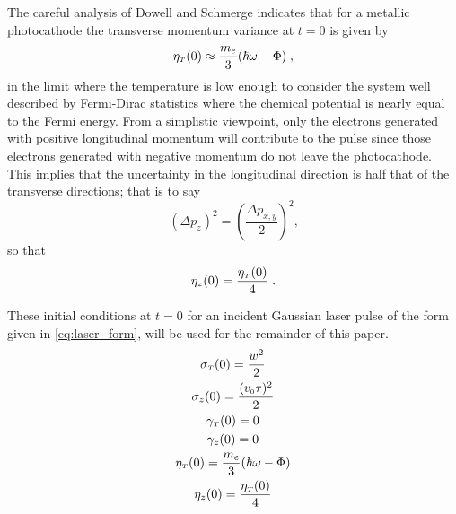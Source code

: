 The careful analysis of Dowell and Schmerge \cite{dowell_quantum_2009} indicates that for a metallic photocathode the transverse momentum variance at $ t = 0 $ is given by
\begin{equation} \label{eq:jensen_eta}
  \eta_{ {\scriptscriptstyle T} } ( 0 ) \approx \frac{ m_{e} }{ 3 } ( \hbar \omega - \Phi ) \; \text{,}
\end{equation}
in the limit where the temperature is low enough to consider the system well described by Fermi-Dirac statistics where the chemical potential is nearly equal to the Fermi energy.
From a simplistic viewpoint, only the electrons generated with positive longitudinal momentum will contribute to the pulse since those electrons generated with negative momentum do not leave the photocathode.
This implies that the uncertainty in the longitudinal direction is half that of the transverse directions; that is to say
\begin{equation}
( \Delta p_{ z } )^{2} = \left ( \frac{\Delta p_{ x , y }}{ 2 } \right )^{2} \text{,}
\end{equation}
so that
\begin{equation}
\eta_{ z } ( 0 ) = \frac{ \eta_{ {\scriptscriptstyle T} } ( 0 )}{ 4 } \; \text{.}
\end{equation}

These initial conditions at $t=0$ for an incident Gaussian laser pulse of the form given in \ref{eq:laser_form}, will be used for the remainder of this paper.
\begin{subequations} \label{eq:summary}
\begin{gather}
\sigma_{ {\scriptscriptstyle T} } ( 0 ) = \frac{ w^{ 2 } }{ 2 } \\
\sigma_{ z } ( 0 ) = \frac{ ( v_{{ \scriptscriptstyle 0}} \tau )^{ 2 } }{ 2 } \\
\gamma_{ {\scriptscriptstyle T} } ( 0 ) = 0 \\
\gamma_{ z } ( 0 ) = 0 \\
\eta_{ {\scriptscriptstyle T} } ( 0 ) = \frac{ m_{e} } { 3 } ( \hbar \omega - \Phi ) \\
\eta_{ z } ( 0 ) = \frac{ \eta_{ {\scriptscriptstyle T} } ( 0 ) }{ 4 }
\end{gather}
\end{subequations}

